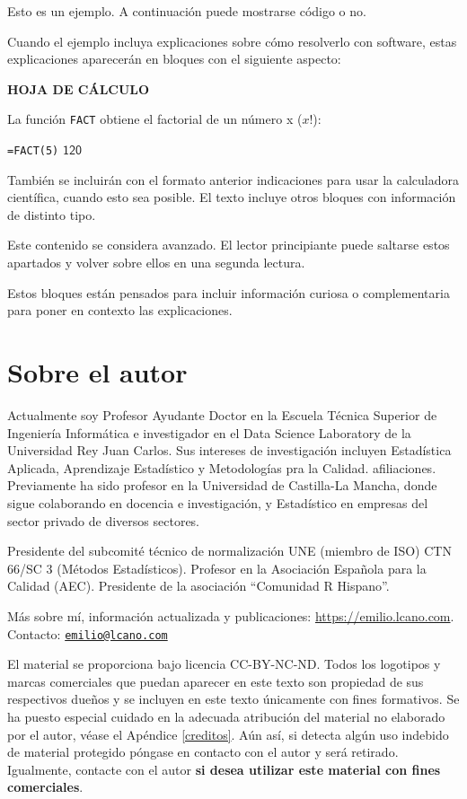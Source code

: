 \documentclass[
]{book}
\begin{document}
Esto es un ejemplo. A continuación puede mostrarse código o no.

Cuando el ejemplo incluya explicaciones sobre cómo resolverlo con software,
estas explicaciones aparecerán en bloques con el siguiente aspecto:

\textbf{HOJA DE CÁLCULO}

La función \texttt{FACT} obtiene el factorial de un número x (\(x!\)):

\texttt{=FACT(5)}
\(\boxed{\mathsf{120}}\)

También se incluirán con el formato anterior indicaciones para usar la calculadora
científica, cuando esto sea posible.
El texto incluye otros bloques con información de distinto tipo.

Este contenido se considera avanzado. El lector principiante puede saltarse estos apartados
y volver sobre ellos en una segunda lectura.

Estos bloques están pensados para incluir información curiosa o complementaria
para poner en contexto las explicaciones.

\hypertarget{sobre-el-autor}{%
\section*{Sobre el autor}\label{sobre-el-autor}}

Actualmente soy Profesor Ayudante Doctor en la Escuela Técnica Superior de Ingeniería Informática e investigador en el Data Science Laboratory de la Universidad Rey Juan Carlos. Sus intereses de investigación incluyen Estadística Aplicada, Aprendizaje Estadístico y Metodologías pra la Calidad. afiliaciones. Previamente ha sido profesor en la Universidad de Castilla-La Mancha, donde sigue colaborando en docencia e investigación, y Estadístico en empresas del sector privado de diversos sectores.

Presidente del subcomité técnico de normalización UNE (miembro de ISO) CTN 66/SC 3 (Métodos Estadísticos). Profesor en la Asociación Española para la Calidad (AEC). Presidente de la asociación ``Comunidad R Hispano''.

Más sobre mí, información actualizada y publicaciones: \url{https://emilio.lcano.com}.\\
Contacto: \href{mailto:emilio@lcano.com}{\nolinkurl{emilio@lcano.com}}

El material se proporciona bajo licencia CC-BY-NC-ND.
Todos los logotipos y marcas comerciales que puedan aparecer en este texto
son propiedad de sus respectivos dueños y se incluyen en este texto únicamente
con fines formativos. Se ha puesto especial cuidado en la adecuada atribución
del material no elaborado por el autor, véase el Apéndice \ref{creditos}.
Aún así, si detecta algún uso
indebido de material protegido póngase en contacto con el autor y será retirado.
Igualmente, contacte con el autor \textbf{si desea utilizar este material con fines
comerciales}.
\end{document}
